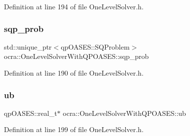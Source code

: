 Definition at line 194 of file One\+Level\+Solver.\+h.

\hypertarget{classocra_1_1OneLevelSolverWithQPOASES_ad432bd42a6211d668efc3b2e2d3df238}{}\label{classocra_1_1OneLevelSolverWithQPOASES_ad432bd42a6211d668efc3b2e2d3df238} 
\subsubsection{\texorpdfstring{sqp\+\_\+prob}{sqp\_prob}}
{\footnotesize\ttfamily std\+::unique\+\_\+ptr$<$qp\+O\+A\+S\+E\+S\+::\+S\+Q\+Problem$>$ ocra\+::\+One\+Level\+Solver\+With\+Q\+P\+O\+A\+S\+E\+S\+::sqp\+\_\+prob\hspace{0.3cm}{\ttfamily [protected]}}



Definition at line 190 of file One\+Level\+Solver.\+h.

\hypertarget{classocra_1_1OneLevelSolverWithQPOASES_a53854c9775b3ff65f4a0621bab17613c}{}\label{classocra_1_1OneLevelSolverWithQPOASES_a53854c9775b3ff65f4a0621bab17613c} 
\subsubsection{\texorpdfstring{ub}{ub}}
{\footnotesize\ttfamily qp\+O\+A\+S\+E\+S\+::real\+\_\+t$\ast$ ocra\+::\+One\+Level\+Solver\+With\+Q\+P\+O\+A\+S\+E\+S\+::ub\hspace{0.3cm}{\ttfamily [protected]}}



Definition at line 199 of file One\+Level\+Solver.\+h.

\hypertarget{classocra_1_1OneLevelSolverWithQPOASES_a2cb624cfce8e1940c5107251418ee7dd}{}\label{classocra_1_1OneLevelSolverWithQPOASES_a2cb624cfce8e1940c5107251418ee7dd} 
